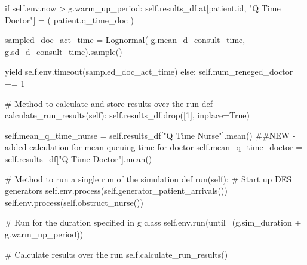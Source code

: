 \documentclass[
  letterpaper,
  DIV=11,
  numbers=noendperiod]{scrreprt}
\newenvironment{Shaded}{}{}
\newcommand{\BuiltInTok}[1]{\textcolor[rgb]{0.84,0.23,0.29}{#1}}
\newcommand{\CommentTok}[1]{\textcolor[rgb]{0.42,0.45,0.49}{#1}}
\newcommand{\ControlFlowTok}[1]{\textcolor[rgb]{0.84,0.23,0.29}{#1}}
\newcommand{\DecValTok}[1]{\textcolor[rgb]{0.00,0.36,0.77}{#1}}
\newcommand{\KeywordTok}[1]{\textcolor[rgb]{0.84,0.23,0.29}{#1}}
\newcommand{\NormalTok}[1]{\textcolor[rgb]{0.14,0.16,0.18}{#1}}
\newcommand{\OperatorTok}[1]{\textcolor[rgb]{0.14,0.16,0.18}{#1}}
\newcommand{\StringTok}[1]{\textcolor[rgb]{0.01,0.18,0.38}{#1}}
\newcommand{\VariableTok}[1]{\textcolor[rgb]{0.89,0.38,0.04}{#1}}
\begin{document}
\begin{tcolorbox}
\begin{Shaded}
\begin{Highlighting}[]
                    \ControlFlowTok{if} \VariableTok{self}\NormalTok{.env.now }\OperatorTok{\textgreater{}}\NormalTok{ g.warm\_up\_period:}
                        \VariableTok{self}\NormalTok{.results\_df.at[patient.}\BuiltInTok{id}\NormalTok{, }\StringTok{"Q Time Doctor"}\NormalTok{] }\OperatorTok{=}\NormalTok{ (}
\NormalTok{                            patient.q\_time\_doc}
\NormalTok{                        )}

\NormalTok{                    sampled\_doc\_act\_time }\OperatorTok{=}\NormalTok{ Lognormal(}
\NormalTok{                        g.mean\_d\_consult\_time, g.sd\_d\_consult\_time).sample()}

                    \ControlFlowTok{yield} \VariableTok{self}\NormalTok{.env.timeout(sampled\_doc\_act\_time)}
                \ControlFlowTok{else}\NormalTok{:}
                    \VariableTok{self}\NormalTok{.num\_reneged\_doctor }\OperatorTok{+=} \DecValTok{1}

    \CommentTok{\# Method to calculate and store results over the run}
    \KeywordTok{def}\NormalTok{ calculate\_run\_results(}\VariableTok{self}\NormalTok{):}
        \VariableTok{self}\NormalTok{.results\_df.drop([}\DecValTok{1}\NormalTok{], inplace}\OperatorTok{=}\VariableTok{True}\NormalTok{)}

        \VariableTok{self}\NormalTok{.mean\_q\_time\_nurse }\OperatorTok{=} \VariableTok{self}\NormalTok{.results\_df[}\StringTok{"Q Time Nurse"}\NormalTok{].mean()}
        \CommentTok{\#\#NEW {-} added calculation for mean queuing time for doctor}
        \VariableTok{self}\NormalTok{.mean\_q\_time\_doctor }\OperatorTok{=} \VariableTok{self}\NormalTok{.results\_df[}\StringTok{"Q Time Doctor"}\NormalTok{].mean()}

    \CommentTok{\# Method to run a single run of the simulation}
    \KeywordTok{def}\NormalTok{ run(}\VariableTok{self}\NormalTok{):}
        \CommentTok{\# Start up DES generators}
        \VariableTok{self}\NormalTok{.env.process(}\VariableTok{self}\NormalTok{.generator\_patient\_arrivals())}
        \VariableTok{self}\NormalTok{.env.process(}\VariableTok{self}\NormalTok{.obstruct\_nurse())}

        \CommentTok{\# Run for the duration specified in g class}
        \VariableTok{self}\NormalTok{.env.run(until}\OperatorTok{=}\NormalTok{(g.sim\_duration }\OperatorTok{+}\NormalTok{ g.warm\_up\_period))}

        \CommentTok{\# Calculate results over the run}
        \VariableTok{self}\NormalTok{.calculate\_run\_results()}


\end{Highlighting}
\end{Shaded}
\end{tcolorbox}
\end{document}
